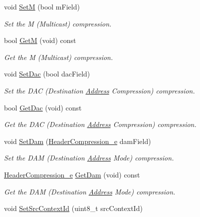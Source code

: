 \begin{DoxyCompactItemize}
void \hyperlink{classns3_1_1SixLowPanIphc_ad9e3313e47f0ae06e3fd0154a8bb25e5}{SetM} (bool m\+Field)
\begin{DoxyCompactList}\small\item\em Set the M (Multicast) compression. \end{DoxyCompactList}\item 
bool \hyperlink{classns3_1_1SixLowPanIphc_a455f933ce0a59e0d40281b72cd22d19e}{GetM} (void) const 
\begin{DoxyCompactList}\small\item\em Get the M (Multicast) compression. \end{DoxyCompactList}\item 
void \hyperlink{classns3_1_1SixLowPanIphc_affc529a56bcd48d931621082f7c25ee8}{Set\+Dac} (bool dac\+Field)
\begin{DoxyCompactList}\small\item\em Set the D\+AC (Destination \hyperlink{classns3_1_1Address}{Address} Compression) compression. \end{DoxyCompactList}\item 
bool \hyperlink{classns3_1_1SixLowPanIphc_a8f9b80016e4f7368128fe7df300c91e6}{Get\+Dac} (void) const 
\begin{DoxyCompactList}\small\item\em Get the D\+AC (Destination \hyperlink{classns3_1_1Address}{Address} Compression) compression. \end{DoxyCompactList}\item 
void \hyperlink{classns3_1_1SixLowPanIphc_a749a58e326a0b383ad14082c1a2a83cb}{Set\+Dam} (\hyperlink{classns3_1_1SixLowPanIphc_a384e6b68c86e9d9a07c923dbc21a6843}{Header\+Compression\+\_\+e} dam\+Field)
\begin{DoxyCompactList}\small\item\em Set the D\+AM (Destination \hyperlink{classns3_1_1Address}{Address} Mode) compression. \end{DoxyCompactList}\item 
\hyperlink{classns3_1_1SixLowPanIphc_a384e6b68c86e9d9a07c923dbc21a6843}{Header\+Compression\+\_\+e} \hyperlink{classns3_1_1SixLowPanIphc_aacdbebaaa0c5c19c39b9d594e3f756d2}{Get\+Dam} (void) const 
\begin{DoxyCompactList}\small\item\em Get the D\+AM (Destination \hyperlink{classns3_1_1Address}{Address} Mode) compression. \end{DoxyCompactList}\item 
void \hyperlink{classns3_1_1SixLowPanIphc_ab67dd4d436be025b505d17311bccc172}{Set\+Src\+Context\+Id} (uint8\+\_\+t src\+Context\+Id)

\end{DoxyCompactItemize}
